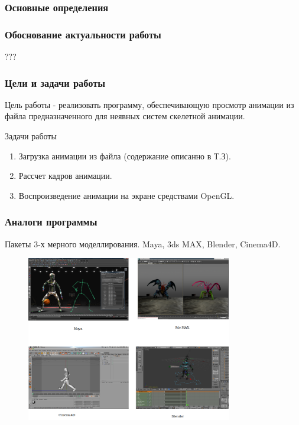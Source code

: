 \documentclass{beamer}
\begin{document}
\begin{frame}
\frametitle{Основные определения}
    
\end{frame}


\begin{frame}
\frametitle{Обоснование актуальности работы}
    \begin{center}            
    \begin{large}
    ???
    \end{large}
    \end{center}
\end{frame}



\begin{frame}
\frametitle{Цели и задачи работы}
    Цель работы - реализовать программу, обеспечивающую просмотр анимации из файла предназначенного для неявных систем скелетной анимации.
    
    \bigskip
    
    Задачи работы
    
    \smallskip
	\begin{enumerate}
	\item Загрузка анимации из файла (содержание описанно в Т.З).
	\item Рассчет кадров анимации.
	\item Воспроизведение анимации на экране средствами OpenGL.
	\end{enumerate}
    
\end{frame}



\begin{frame}
\frametitle{Аналоги программы}
    \scriptsize{Пакеты 3-х мерного моделлирования. Maya, 3ds MAX, Blender, Cinema4D.}
\begin{figure}[h!]
    \centering
    \includegraphics[width=0.8\textwidth]{all_tools.png}
\end{figure}

\end{frame}
\end{document}
